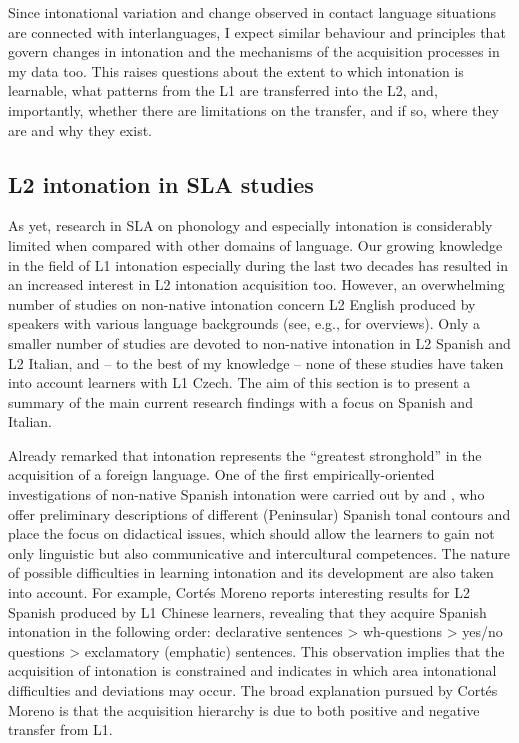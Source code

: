 Since intonational variation and change observed in contact language situations are connected with interlanguages, I expect similar behaviour and principles that govern changes in intonation and the mechanisms of the acquisition processes in my data too. This raises questions about the extent to which intonation is learnable, what patterns from the L1 are transferred into the L2, and, importantly, whether there are limitations on the transfer, and if so, where they are and why they exist.


\subsection{L2 intonation in SLA studies}\label{sec:1.4.2}

As yet, research in SLA on phonology and especially intonation is considerably limited when compared with other domains of language. Our growing knowledge in the field of L1 intonation especially during the last two decades has resulted in an increased interest in L2 intonation acquisition too. However, an overwhelming number of studies on non-native intonation concern L2 English produced by speakers with various language backgrounds (see, e.g., \citealt{Barlow1998, Gut2009, Mennen2007,Mennen2015, MennendeLeeuw2014, Puga2019,Puga2021} for overviews). Only a smaller number of studies are devoted to non-native intonation in L2 Spanish and L2 Italian, and -- to the best of my knowledge -- none of these studies have taken into account learners with L1 Czech. The aim of this section is to present a summary of the main current research findings with a focus on Spanish and Italian.

\begin{sloppypar}
Already  \citet[7]{NavarroTomás1948} remarked that intonation represents the “greatest stronghold” in the acquisition of a foreign language. One of the first em\-pir\-i\-cal\-ly-ori\-ent\-ed investigations of non-native Spanish intonation were carried out by \citet{Cantero1994} and \citet{CortésMoreno1998, CortésMoreno2001}, who offer preliminary descriptions of different (Peninsular) Spanish tonal contours and place the focus on didactical issues, which should allow the learners to gain not only linguistic but also communicative and intercultural competences. The nature of possible difficulties in learning intonation and its development are also taken into account. For example, Cortés Moreno reports interesting results for L2 Spanish produced by L1 Chinese learners, revealing that they acquire Spanish intonation in the following order: declarative sentences > wh-questions > yes/no questions > exclamatory (emphatic) sentences. This observation implies that the acquisition of intonation is constrained and indicates in which area intonational difficulties and deviations may occur. The broad explanation pursued by Cortés Moreno is that the acquisition hierarchy is due to both positive and negative transfer from L1.
\end{sloppypar}



